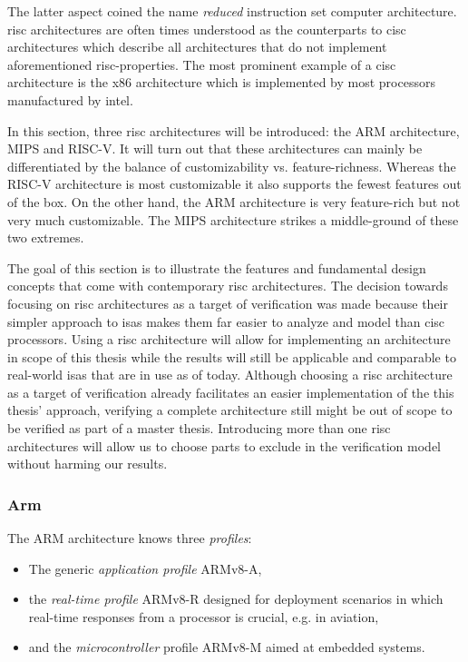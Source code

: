 The latter aspect coined the name \textit{reduced} instruction set computer architecture.
\gls{risc} architectures are often times understood as the counterparts to \gls{cisc} architectures which describe all architectures that do not implement aforementioned \gls{risc}-properties.
The most prominent example of a \gls{cisc} architecture is the x86 architecture which is implemented by most processors manufactured by intel.

In this section, three \gls{risc} architectures will be introduced: the ARM architecture, MIPS and RISC-V.
It will turn out that these architectures can mainly be differentiated by the balance of customizability vs. feature-richness.
Whereas the RISC-V architecture is most customizable it also supports the fewest features out of the box.
On the other hand, the ARM architecture is very feature-rich but not very much customizable.
The MIPS architecture strikes a middle-ground of these two extremes.

The goal of this section is to illustrate the features and fundamental design concepts that come with contemporary \gls{risc} architectures.
The decision towards focusing on \gls{risc} architectures as a target of verification was made because their simpler approach to \glspl{isa} makes them far easier to analyze and model than \gls{cisc} processors.
Using a \gls{risc} architecture will allow for implementing an architecture in scope of this thesis while the results will still be applicable and comparable to real-world \glspl{isa} that are in use as of today.
Although choosing a \gls{risc} architecture as a target of verification already facilitates an easier implementation of the this thesis' approach, verifying a complete architecture still might be out of scope to be verified as part of a master thesis.
Introducing more than one \gls{risc} architectures will allow us to choose parts to exclude in the verification model without harming our results.

\subsubsection{Arm}

The ARM architecture knows three \textit{profiles}:
\begin{itemize}
    \item The generic \textit{application profile} ARMv8-A,
    \item the \textit{real-time profile} ARMv8-R designed for deployment scenarios in which real-time responses from a processor is crucial, e.g. in aviation,
    \item and the \textit{microcontroller} profile ARMv8-M aimed at embedded systems.
\end{itemize}

